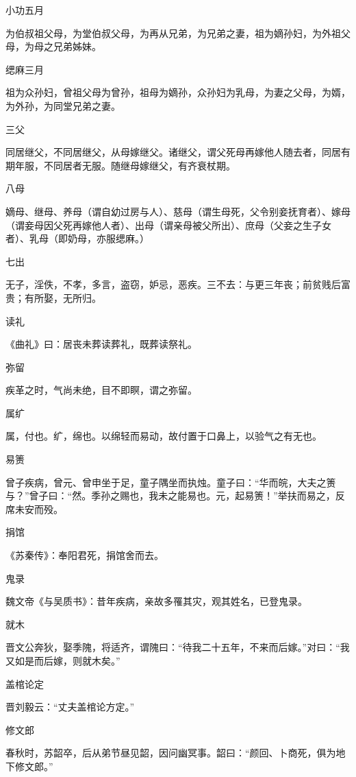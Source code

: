 \documentclass[a4paper,12pt,UTF8,twoside]{ctexbook}
\begin{document}
    小功五月
    
    为伯叔祖父母，为堂伯叔父母，为再从兄弟，为兄弟之妻，祖为嫡孙妇，为外祖父母，为母之兄弟姊妹。
    
    缌麻三月
    
    祖为众孙妇，曾祖父母为曾孙，祖母为嫡孙，众孙妇为乳母，为妻之父母，为婿，为外孙，为同堂兄弟之妻。
    
    三父
    
    同居继父，不同居继父，从母嫁继父。诸继父，谓父死母再嫁他人随去者，同居有期年服，不同居者无服。随继母嫁继父，有齐衰杖期。
    
    八母
    
    嫡母、继母、养母（谓自幼过房与人）、慈母（谓生母死，父令别妾抚育者）、嫁母（谓妾母因父死再嫁他人者）、出母（谓亲母被父所出）、庶母（父妾之生子女者）、乳母（即奶母，亦服缌麻。）
    
    七出
    
    无子，淫佚，不孝，多言，盗窃，妒忌，恶疾。三不去：与更三年丧；前贫贱后富贵；有所娶，无所归。
    
    读礼
    
    《曲礼》曰：居丧未葬读葬礼，既葬读祭礼。
    
    弥留
    
    疾革之时，气尚未绝，目不即瞑，谓之弥留。
    
    属纩
    
    属，付也。纩，绵也。以绵轻而易动，故付置于口鼻上，以验气之有无也。
    
    易箦
    
    曾子疾病，曾元、曾申坐于足，童子隅坐而执烛。童子曰：“华而皖，大夫之箦与？”曾子曰：“然。季孙之赐也，我未之能易也。元，起易箦！”举扶而易之，反席未安而殁。
    
    捐馆
    
    《苏秦传》：奉阳君死，捐馆舍而去。
    
    鬼录
    
    魏文帝《与吴质书》：昔年疾病，亲故多罹其灾，观其姓名，已登鬼录。
    
    就木
    
    晋文公奔狄，娶季隗，将适齐，谓隗曰：“待我二十五年，不来而后嫁。”对曰：“我又如是而后嫁，则就木矣。”
    
    盖棺论定
    
    晋刘毅云：“丈夫盖棺论方定。”
    
    修文郎
    
    春秋时，苏韶卒，后从弟节昼见韶，因问幽冥事。韶曰：“颜回、卜商死，俱为地下修文郎。”
    
\end{document}
